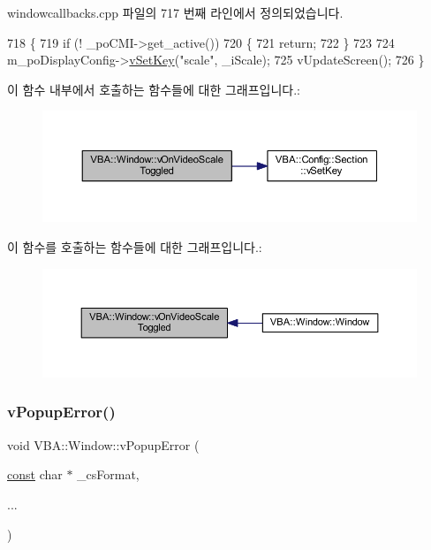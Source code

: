 windowcallbacks.\+cpp 파일의 717 번째 라인에서 정의되었습니다.


\begin{DoxyCode}
718 \{
719   \textcolor{keywordflow}{if} (! \_poCMI->get\_active())
720   \{
721     \textcolor{keywordflow}{return};
722   \}
723 
724   m\_poDisplayConfig->\mbox{\hyperlink{class_v_b_a_1_1_config_1_1_section_a57e1b95cbea40db71c093381beff4b0e}{vSetKey}}(\textcolor{stringliteral}{"scale"}, \_iScale);
725   vUpdateScreen();
726 \}
\end{DoxyCode}
이 함수 내부에서 호출하는 함수들에 대한 그래프입니다.\+:
\nopagebreak
\begin{figure}[H]
\begin{center}
\leavevmode
\includegraphics[width=350pt]{class_v_b_a_1_1_window_af0072d4a223c1a543dd5ce0933a72804_cgraph}
\end{center}
\end{figure}
이 함수를 호출하는 함수들에 대한 그래프입니다.\+:
\nopagebreak
\begin{figure}[H]
\begin{center}
\leavevmode
\includegraphics[width=350pt]{class_v_b_a_1_1_window_af0072d4a223c1a543dd5ce0933a72804_icgraph}
\end{center}
\end{figure}
\mbox{\label{class_v_b_a_1_1_window_afde18894816458e195f561b03ee2898c}} 
\subsubsection{\texorpdfstring{v\+Popup\+Error()}{vPopupError()}}
{\footnotesize\ttfamily void V\+B\+A\+::\+Window\+::v\+Popup\+Error (\begin{DoxyParamCaption}\item[{\mbox{\hyperlink{getopt1_8c_a2c212835823e3c54a8ab6d95c652660e}{const}} char $\ast$}]{\+\_\+cs\+Format,  }\item[{}]{... }\end{DoxyParamCaption})}



